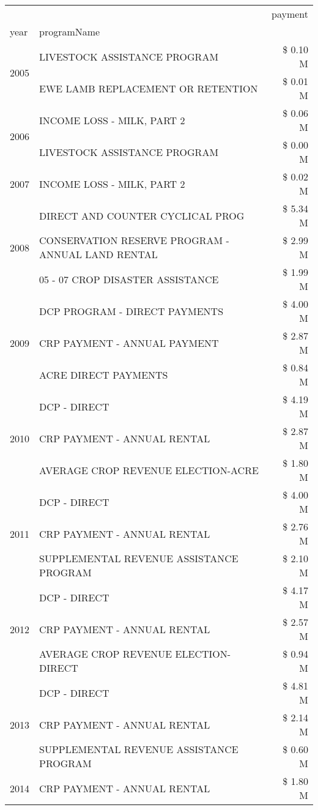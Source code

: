 \begin{tabular}{llr}
\toprule
 &  & payment \\
year & programName &  \\
\midrule
\multirow[t]{2}{*}{2005} & LIVESTOCK ASSISTANCE PROGRAM & \$ 0.10 M \\
 & EWE LAMB REPLACEMENT OR RETENTION & \$ 0.01 M \\
\cline{1-3}
\multirow[t]{2}{*}{2006} & INCOME LOSS - MILK, PART 2 & \$ 0.06 M \\
 & LIVESTOCK ASSISTANCE PROGRAM & \$ 0.00 M \\
\cline{1-3}
2007 & INCOME LOSS - MILK, PART 2 & \$ 0.02 M \\
\cline{1-3}
\multirow[t]{3}{*}{2008} & DIRECT AND COUNTER CYCLICAL PROG & \$ 5.34 M \\
 & CONSERVATION RESERVE PROGRAM - ANNUAL LAND RENTAL & \$ 2.99 M \\
 & 05 - 07 CROP DISASTER ASSISTANCE & \$ 1.99 M \\
\cline{1-3}
\multirow[t]{3}{*}{2009} & DCP PROGRAM - DIRECT PAYMENTS & \$ 4.00 M \\
 & CRP PAYMENT - ANNUAL PAYMENT & \$ 2.87 M \\
 & ACRE DIRECT PAYMENTS & \$ 0.84 M \\
\cline{1-3}
\multirow[t]{3}{*}{2010} & DCP - DIRECT & \$ 4.19 M \\
 & CRP PAYMENT - ANNUAL RENTAL & \$ 2.87 M \\
 & AVERAGE CROP REVENUE ELECTION-ACRE & \$ 1.80 M \\
\cline{1-3}
\multirow[t]{3}{*}{2011} & DCP - DIRECT & \$ 4.00 M \\
 & CRP PAYMENT - ANNUAL RENTAL & \$ 2.76 M \\
 & SUPPLEMENTAL REVENUE ASSISTANCE PROGRAM & \$ 2.10 M \\
\cline{1-3}
\multirow[t]{3}{*}{2012} & DCP - DIRECT & \$ 4.17 M \\
 & CRP PAYMENT - ANNUAL RENTAL & \$ 2.57 M \\
 & AVERAGE CROP REVENUE ELECTION-DIRECT & \$ 0.94 M \\
\cline{1-3}
\multirow[t]{3}{*}{2013} & DCP - DIRECT & \$ 4.81 M \\
 & CRP PAYMENT - ANNUAL RENTAL & \$ 2.14 M \\
 & SUPPLEMENTAL REVENUE ASSISTANCE PROGRAM & \$ 0.60 M \\
\cline{1-3}
\multirow[t]{3}{*}{2014} & CRP PAYMENT - ANNUAL RENTAL & \$ 1.80 M \\

\end{tabular}
